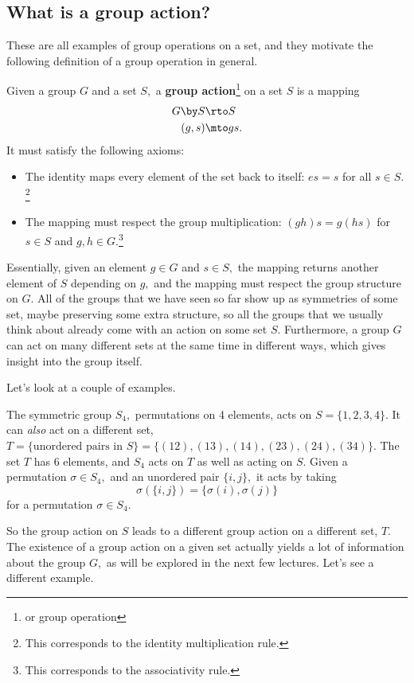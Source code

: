\subsection{What is a group action?}
These are all examples of group operations on a set, and they motivate the following definition of a group operation in general.
\begin{definition}
Given a group $G$ and a set $S,$ a \textbf{group action}\footnote{or group operation} on a set $S$ is a mapping 
\begin{align*}
    G \by S &\rto S \\
    (g, s) &\mto gs.
\end{align*}
It must satisfy the following axioms:
\begin{itemize}
    \item The identity maps every element of the set back to itself: $es = s$ for all $s \in S.$\footnote{This corresponds to the identity multiplication rule.}
    \item The mapping must respect the group multiplication: $(gh)s = g(hs)$ for $s \in S$ and $g, h \in G.$\footnote{This corresponds to the associativity rule.}
\end{itemize}
\end{definition}

Essentially, given an element $g \in G$ and $s \in S,$ the mapping returns another element of $S$ depending on $g,$ and the mapping must respect the group structure on $G.$ All of the groups that we have seen so far show up as symmetries of some set, maybe preserving some extra structure, so all the groups that we usually think about already come with an action on some set $S.$ Furthermore, a group $G$ can act on many different sets at the same time in different ways, which gives insight into the group itself.

Let's look at a couple of examples.
\begin{example}[$S_4$]
The symmetric group $S_4,$ permutations on 4 elements, acts on $S = \{1, 2, 3, 4\}$. It can \emph{also} act on a different set, $T = \{\text{unordered pairs in } S \} = \{(12),(13), (14), (23), (24), (34)\}.$ The set $T$ has 6 elements, and $S_4$ acts on $T$ as well as acting on $S.$ Given a permutation $\sigma \in S_4,$ and an unordered pair $\{i, j\},$ it acts by taking
\[
\sigma(\{i, j\}) = \{\sigma(i), \sigma(j)\}
\]
for a permutation $\sigma \in S_4.$ 
\end{example}

So the group action on $S$ leads to a different group action on a different set, $T.$ The existence of a group action on a given set actually yields a lot of information about the group $G,$ as will be explored in the next few lectures. Let's see a different example.

